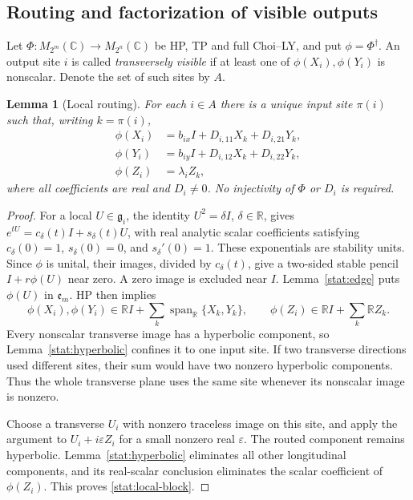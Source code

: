 \documentclass[reqno]{amsart}
\newtheorem{lemma}[theorem]{Lemma}
\theoremstyle{definition}
\theoremstyle{remark}
\newcommand{\C}{\mathbb C}
\newcommand{\R}{\mathbb R}
\begin{document}
\subsection{Routing and factorization of visible outputs}

Let \(\Phi:M_{2^m}(\C)\to M_{2^n}(\C)\) be HP, TP and full
Choi--LY, and put \(\phi=\Phi^\dagger\).  An output site \(i\)
is called \emph{transversely visible} if at least one of
\(\phi(X_i),\phi(Y_i)\) is nonscalar.  Denote the set of such
sites by \(A\).

\begin{lemma}[Local routing]
\label{stat:routing}
For each \(i\in A\) there is a unique input site \(\pi(i)\) such
that, writing \(k=\pi(i)\),
\begin{equation}
 \begin{split}
 \phi(X_i)&=b_{ix}I+D_{i,11}X_k+D_{i,21}Y_k,\\
 \phi(Y_i)&=b_{iy}I+D_{i,12}X_k+D_{i,22}Y_k,\\
 \phi(Z_i)&=\lambda_i Z_k,
 \end{split}
 \label{stat:local-block}
\end{equation}
where all coefficients are real and \(D_i\ne0\).  No injectivity
of \(\Phi\) or \(D_i\) is required.
\end{lemma}

\begin{proof}
For a local \(U\in\mathfrak g_i\), the identity
\(U^2=\delta I\), \(\delta\in\R\), gives
\(e^{tU}=c_\delta(t)I+s_\delta(t)U\), with real analytic scalar
coefficients satisfying \(c_\delta(0)=1\), \(s_\delta(0)=0\),
and \(s_\delta'(0)=1\).  These exponentials are stability units.
Since \(\phi\) is unital, their images, divided by
\(c_\delta(t)\), give a two-sided stable pencil
\(I+r\phi(U)\) near zero.  A zero image is excluded near \(I\).
Lemma~\ref{stat:edge} puts \(\phi(U)\) in \(\mathfrak e_m\).
HP then implies
\[
 \phi(X_i),\phi(Y_i)\in\R I+
       \sum_k\operatorname{span}_{\R}\{X_k,Y_k\},
 \qquad
 \phi(Z_i)\in\R I+\sum_k\R Z_k.
\]
Every nonscalar transverse image has a hyperbolic component, so
Lemma~\ref{stat:hyperbolic} confines it to one input site.  If two
transverse directions used different sites, their sum would have
two nonzero hyperbolic components.  Thus the whole transverse plane
uses the same site whenever its nonscalar image is nonzero.

Choose a transverse \(U_i\) with nonzero traceless image on this
site, and apply the argument to \(U_i+i\varepsilon Z_i\) for a
small nonzero real \(\varepsilon\).  The routed component remains
hyperbolic.  Lemma~\ref{stat:hyperbolic} eliminates all other
longitudinal components, and its real-scalar conclusion eliminates
the scalar coefficient of \(\phi(Z_i)\).  This proves
\eqref{stat:local-block}.
\end{proof}
\end{document}
